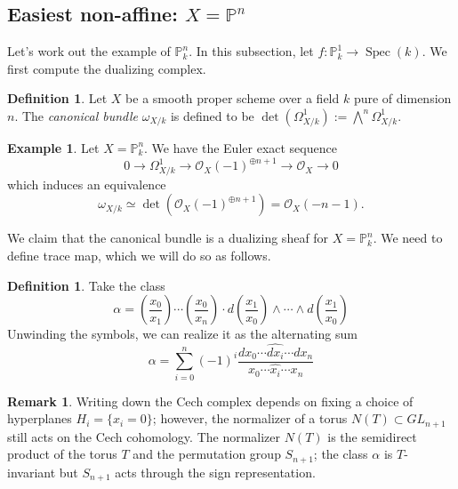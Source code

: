\documentclass[10pt]{article}
\theoremstyle{definition}
\newtheorem{exmp}[thm]{Example}
\newtheorem{defn}[thm]{Definition}
\newtheorem{rmk}[thm]{Remark}
\DeclareMathOperator{\Spec}{Spec}
\DeclareMathOperator{\QCoh}{QCoh}
\newcommand{\PP}{\mathbb{P}}
\newcommand{\OO}{\mathcal{O}}
\begin{document}
\subsection{Easiest non-affine: $X = \mathbb{P}^n$}


Let's work out the example of $\mathbb{P}^n_k$.  In this subsection, let $f: \mathbb{P}^1_k \rightarrow \Spec(k)$.  We first compute the dualizing complex.
\begin{defn}
Let $X$ be a smooth proper scheme over a field $k$ pure of dimension $n$.  The \emph{canonical bundle} $\omega_{X/k}$ is defined to be $\det(\Omega^1_{X/k}) := \bigwedge^n \Omega^1_{X/k}$.  %
\end{defn}

\begin{exmp}
Let $X = \PP^n_k$.  We have the Euler exact sequence
$$0 \rightarrow \Omega^1_{X/k} \rightarrow \OO_X(-1)^{\oplus n+1} \rightarrow \OO_X \rightarrow 0$$
which induces an equivalence
$$\omega_{X/k} \simeq \det(\OO_X(-1)^{\oplus n+1}) = \OO_X(-n-1).$$
\end{exmp}

We claim that the canonical bundle is a dualizing sheaf for $X = \PP^n_k$.  We need to define trace map, which we will do so as follows.
\begin{defn}
Take the class
$$\alpha = \left( \frac{x_0}{x_1} \right) \cdots \left( \frac{x_0}{x_n} \right) \cdot d\left( \frac{x_1}{x_0} \right) \wedge \cdots \wedge d\left( \frac{x_1}{x_0} \right)$$
Unwinding the symbols, we can realize it as the alternating sum
$$\alpha = \sum_{i=0}^n (-1)^i \frac{dx_0 \cdots \widehat{dx_i} \cdots dx_n}{x_0 \cdots \widehat{x_i} \cdots x_n}$$
\end{defn}

\begin{rmk}
Writing down the Cech complex depends on fixing a choice of hyperplanes $H_i = \{x_i = 0\}$; however, the normalizer of a torus $N(T) \subset GL_{n+1}$ still acts on the Cech cohomology.  The normalizer $N(T)$ is the semidirect product of the torus $T$ and the permutation group $S_{n+1}$; the class $\alpha$ is $T$-invariant but $S_{n+1}$ acts through the sign representation.
\end{rmk}
\end{document}
